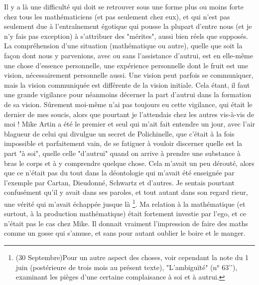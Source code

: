 Il y a là une difficulté qui doit se retrouver sous une forme plus ou moins forte chez tous les mathématiciens (et pas seulement chez eux), et qui n'est pas seulement due à l'entraînement égotique qui pousse la plupart d'entre nous (et je n'y fais pas exception) à s'attribuer des "mérites", aussi bien réels que supposés. La compréhension d'une situation (mathématique ou autre), quelle que soit la façon dont nous y parvenions, avec ou sans l'assistance d'autrui, est en elle-même une chose d'essence personnelle, une expérience personnelle dont le fruit est une vision, nécessairement personnelle aussi. Une vision peut parfois se communiquer, mais la vision communiquée est différente de la vision initiale. Cela étant, il faut une grande vigilance pour néanmoins décerner la part d'autrui dans la formation de sa vision. Sûrement moi-même n'ai pas toujours eu cette vigilance, qui était le dernier de mes soucis, alors que pourtant je l'attendais chez les autres vis-à-vis de moi ! Mike Artin a été le premier et seul qui m'ait fait entendre un jour, avec l'air blagueur de celui qui divulgue un secret de Polichinelle, que c'était à la fois impossible et parfaitement vain, de se fatiguer à vouloir discerner quelle est la part "à soi", quelle celle "d'autrui" quand on arrive à prendre une substance à bras le corps et à y comprendre quelque chose. Cela m'avait un peu dérouté, alors que ce n'était pas du tout dans la déontologie qui m'avait été enseignée par l'exemple par Cartan, Dieudonné, Schwartz et d'autres. Je sentais pourtant confusément qu'il y avait dans ses paroles, et tout autant dans son regard rieur, une vérité qui m'avait échappée jusque là \footnote{(30 Septembre)Pour un autre aspect des choses, voir cependant la note du 1 juin (postérieure de trois mois au présent texte), "L'ambiguïté" (n° 63’’), examinant les pièges d'une certaine complaisance à soi et à autrui.}. Ma relation à la mathématique (et surtout, à la production mathématique) était fortement investie par l'ego, et ce n'était pas le cas chez Mike. Il donnait vraiment l'impression de faire des maths comme un gosse qui s'amuse, et sans pour autant oublier le boire et le manger.

